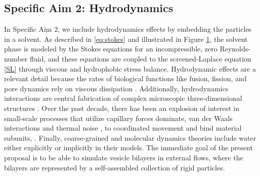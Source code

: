\subsection{Specific Aim 2: Hydrodynamics}
\label{subsec:specific_aim_2}
In Specific Aim 2, we include hydrodynamics effects by embedding the particles in a solvent. 
As described in \eqref{eq:stokes} and illustrated in Figure \ref{fig:flow_map}, 
the solvent phase is modeled by the Stokes equations for an incompressible, zero Reynolds-number fluid, 
and these equations are coupled to the screened-Laplace equation \eqref{SL} through viscous and hydrophobic stress balance.
Hydrodynamic effects are a relevant detail  
because the rates of biological functions like fusion, fission, and pore dynamics rely on viscous dissipation \cite{RYHAM20112929}. 
Additionally, hydrodynamics interactions are central fabrication of complex microscopic three-dimensional structures \cite{Cho2010}.
Over the past decade, there has been an explosion of interest in small-scale processes that utilize capillary forces dominate,  van der Waals interactions and thermal noise  \cite{Zhang2017}, to coordinated movement and bind  material subunits, \cite{Pandey2011,Leong2007,Reynolds2019, Dasgupta2017,Siontorou2017}.
Finally, coarse-grained and molecular dynamics theories include water either explicitly or implicitly in their models. 
The immediate goal of the present proposal
is to be able to simulate vesicle bilayers in external flows, where the bilayers are represented by a self-assembled collection of rigid particles.

\begin{figure}[h]
    \caption{\label{fig:flow_map}}
\end{figure}


